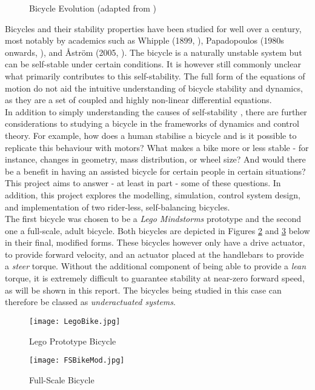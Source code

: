 \begin{figure}[H]
	\centering
    \def\svgwidth{0.9\textwidth}
    
    \caption{Bicycle Evolution (adapted from \cite{bikeevo})}
	\label{fig:bikeevo}
\end{figure}

Bicycles and their stability properties have been studied for well over a century, most notably by academics such as Whipple (1899, \cite{whipple}), Papadopoulos (1980s onwards, \cite{papadopoulos}), and {\AA}str{\"o}m (2005, \cite{astrom}). The bicycle is a naturally unstable system but can be self-stable under certain conditions. It is however still commonly unclear what primarily contributes to this self-stability. The full form of the equations of motion do not aid the intuitive understanding of bicycle stability and dynamics, as they are a set of coupled and highly non-linear differential equations. \\

\noindent In addition to simply understanding the causes of self-stability , there are further considerations to studying a bicycle in the frameworks of dynamics and control theory. For example, how does a human stabilise a bicycle and is it possible to replicate this behaviour with motors? What makes a bike more or less stable - for instance, changes in geometry, mass distribution, or wheel size? And would there be a benefit in having an assisted bicycle for certain people in certain situations? \\

\noindent This project aims to answer - at least in part - some of these questions. In addition, this project explores the modelling, simulation, control system design, and implementation of two rider-less, self-balancing bicycles. \\

The first bicycle was chosen to be a \textit{Lego Mindstorms} prototype and the second one a full-scale, adult bicycle. Both bicycles are depicted in Figures \ref{fig:lego} and \ref{fig:fs} below in their final, modified forms. These bicycles however only have a drive actuator, to provide forward velocity, and an actuator placed at the handlebars to provide a \textit{steer} torque. Without the additional component of being able to provide a \textit{lean} torque, it is extremely difficult to guarantee stability at near-zero forward speed, as will be shown in this report. The bicycles being studied in this case can therefore be classed as \textit{underactuated systems}.

\vfill

\begin{figure}[h]
\centering
\texttt{[image: LegoBike.jpg]}
\caption{Lego Prototype Bicycle}
\label{fig:lego}
\end{figure}

\begin{figure}[h]
\centering
\texttt{[image: FSBikeMod.jpg]}
\caption{Full-Scale Bicycle}
\label{fig:fs}
\end{figure}

\newpage